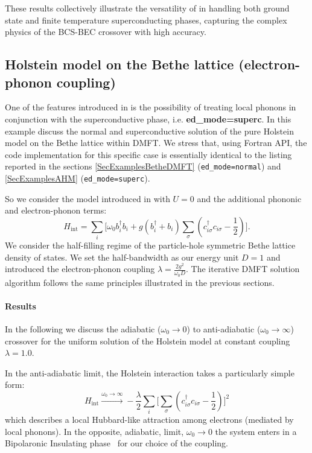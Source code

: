 \documentclass[edipack_sp.tex]{subfiles}
\begin{document}
These results collectively illustrate the versatility of \NAME in 
handling both ground state and finite temperature superconducting 
phases, capturing the complex physics of the BCS-BEC crossover with 
high accuracy.





\subsection{Holstein model on the Bethe lattice (electron-phonon coupling)}
One of the features introduced in \NAME is the possibility of treating
local phonons in conjunction with the superconductive phase,
i.e. \textbf{ed\_mode=superc}. 
In this example discuss  the normal and
superconductive solution of the pure Holstein model on the Bethe
lattice within DMFT.
We stress that, using Fortran API, the code
implementation for this specific case is essentially identical to the listing reported in the sections
\ref{SecExamplesBetheDMFT} ({\tt ed\_mode=normal}) and
\ref{SecExamplesAHM} ({\tt ed\_mode=superc}). 

So we consider the model introduced in 
with $U=0$ and the additional phononic and electron-phonon terms:
\begin{equation} \label{eqex:H_Holstein}
    H_\mathrm{int} = \sum_i \Big[\omega_0 b^\dagger_i b_i + g(b^\dagger_i +
    b_i)\sum_{\sigma}(c^\dagger_{i\sigma}c_{i\sigma}
    -\frac{1}{2})\Big]. 
\end{equation}
We consider the half-filling regime of the particle-hole symmetric
Bethe lattice density of states. We set the half-bandwidth as our
energy unit $D=1$ and introduced the electron-phonon coupling $\lambda
= \tfrac{2g^2}{\omega_0D}$.  
The iterative DMFT solution algorithm follows the same principles
illustrated in the previous sections. 

\paragraph{Results}
In the following we discuss the adiabatic ($\omega_0\to0$) to
anti-adiabatic ($\omega_0\to\infty$) crossover for
the uniform solution of the Holstein model at constant coupling $\lambda=1.0$.

In the anti-adiabatic limit, the Holstein interaction takes a
particularly simple form:
\begin{equation}\label{HlikeAttraction}
    H_\mathrm{int} \overset{ \omega_0 \rightarrow \infty}{ \longrightarrow } -\frac{\lambda}{2} \sum_i \Big[\sum_\sigma(c^\dagger_{i\sigma}c_{i\sigma} -\frac{1}{2}) \Big]^2
\end{equation}
which describes a local Hubbard-like attraction among electrons
(mediated by local phonons).
In the opposite, adiabatic, limit, $\omega_0 \rightarrow 0$ the system
enters in a Bipolaronic Insulating phase~\cite{Capone2006PRB} for our
choice of the coupling. 
\end{document}
